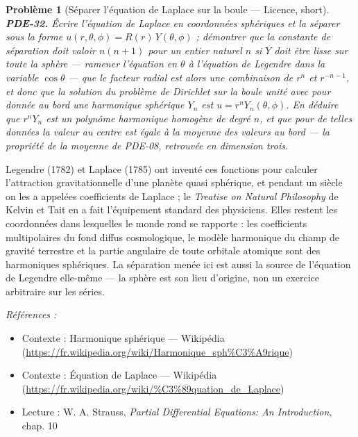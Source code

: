 \documentclass[11pt]{article}
\newtheorem{problem}{Problème}
\newenvironment{refs}{\par\small\noindent\emph{Références :}\begin{itemize}\setlength\itemsep{0pt}}{\end{itemize}\normalsize}
\begin{document}
\begin{problem}[{Séparer l'équation de Laplace sur la boule --- Licence, short}]
\textbf{PDE-32.} Écrire l'équation de Laplace en coordonnées sphériques et
la séparer sous la forme $u(r,\theta,\phi) = R(r)\,Y(\theta,\phi)$ ; démontrer que la constante
de séparation doit valoir $n(n+1)$ pour un entier naturel $n$ si $Y$ doit être lisse sur toute
la sphère --- ramener l'équation en $\theta$ à l'équation de Legendre dans la variable
$\cos\theta$ --- que le facteur radial est alors une combinaison de $r^{n}$ et $r^{-n-1}$, et
donc que la solution du problème de Dirichlet sur la boule unité avec pour donnée au bord une
harmonique sphérique $Y_n$ est $u = r^{n} Y_n(\theta,\phi)$. En déduire que $r^n Y_n$ est un
polynôme harmonique homogène de degré $n$, et que pour de telles données la valeur au centre est
égale à la moyenne des valeurs au bord --- la propriété de la moyenne de PDE-08, retrouvée en
dimension trois.
\end{problem}

\noindent Legendre (1782) et Laplace (1785) ont inventé ces fonctions pour calculer
l'attraction gravitationnelle d'une planète quasi sphérique, et pendant un siècle on les a
appelées coefficients de Laplace ; le \textit{Treatise on Natural Philosophy} de Kelvin et Tait en a
fait l'équipement standard des physiciens. Elles restent les coordonnées dans lesquelles le monde
rond se rapporte : les coefficients multipolaires du fond diffus cosmologique, le modèle harmonique
du champ de gravité terrestre et la partie angulaire de toute orbitale atomique sont des
harmoniques sphériques. La séparation menée ici est aussi la source de l'équation de Legendre
elle-même --- la sphère est son lieu d'origine, non un exercice arbitraire sur les séries.

\begin{refs}
\item Contexte : Harmonique sphérique --- Wikipédia (\url{https://fr.wikipedia.org/wiki/Harmonique_sph%C3%A9rique})
\item Contexte : Équation de Laplace --- Wikipédia (\url{https://fr.wikipedia.org/wiki/%C3%89quation_de_Laplace})
\item Lecture : W. A. Strauss, \textit{Partial Differential Equations: An Introduction}, chap. 10
\end{refs}

\bigskip
\end{document}
